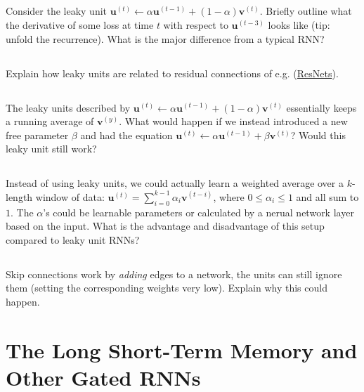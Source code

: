 \documentclass[a4paper]{report}
\renewcommand{\vec}[1]{{\boldsymbol{#1}}}
\newcommand{\tvec}[2]{{\vec{#1}^{(#2)}}}
\begin{document}
    \subsection{} Consider the leaky unit $\tvec{u}{t} \leftarrow \alpha \tvec{u}{t-1} + (1-\alpha)\tvec{v}{t}$. Briefly outline what the derivative of some loss at time $t$ with respect to $\tvec{u}{t-3}$ looks like (tip: unfold the recurrence). What is the major difference from a typical RNN?

    \subsection{} Explain how leaky units are related to residual connections of e.g. (\href{https://arxiv.org/abs/1512.03385}{ResNets}).

    \subsection{} The leaky units described by $\tvec{u}{t} \leftarrow \alpha \tvec{u}{t-1} + (1-\alpha)\tvec{v}{t}$ essentially keeps a running average of $\tvec{v}{y}$. What would happen if we instead introduced a new free parameter $\beta$ and had the equation $\tvec{u}{t} \leftarrow \alpha \tvec{u}{t-1} + \beta\tvec{v}{t}$? Would this leaky unit still work?

    \subsection{} Instead of using leaky units, we could actually learn a weighted average over a $k$-length window of data: $\tvec{u}{t} = \sum_{i=0}^{k-1} \alpha_i \tvec{v}{t-i}$, where $0 \leq \alpha_i \leq 1$ and all sum to $1$. The $\alpha$'s could be learnable parameters or calculated by a nerual network layer based on the input. What is the advantage and disadvantage of this setup compared to leaky unit RNNs?

    \subsection{}
    Skip connections work by \emph{adding} edges to a network, the units can still ignore them (setting the corresponding weights very low). Explain why this could happen.

    \section{The Long Short-Term Memory and Other Gated RNNs}
\end{document}
